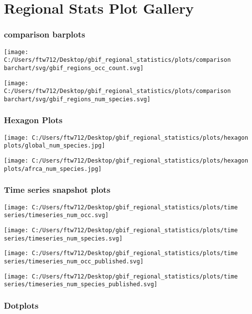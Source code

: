 \documentclass[]{article}
\title{}
\author{}
\date{}
\begin{document}
\hypertarget{regional-stats-plot-gallery}{%
\section{Regional Stats Plot
Gallery}\label{regional-stats-plot-gallery}}

\hypertarget{comparison-barplots}{%
\subsubsection{comparison barplots}\label{comparison-barplots}}

\texttt{[image: C:/Users/ftw712/Desktop/gbif\_regional\_statistics/plots/comparison barchart/svg/gbif\_regions\_occ\_count.svg]}

\texttt{[image: C:/Users/ftw712/Desktop/gbif\_regional\_statistics/plots/comparison barchart/svg/gbif\_regions\_num\_species.svg]}

\hypertarget{hexagon-plots}{%
\subsubsection{Hexagon Plots}\label{hexagon-plots}}

\texttt{[image: C:/Users/ftw712/Desktop/gbif\_regional\_statistics/plots/hexagon plots/global\_num\_species.jpg]}

\texttt{[image: C:/Users/ftw712/Desktop/gbif\_regional\_statistics/plots/hexagon plots/afrca\_num\_species.jpg]}

\hypertarget{time-series-snapshot-plots}{%
\subsubsection{Time series snapshot
plots}\label{time-series-snapshot-plots}}

\texttt{[image: C:/Users/ftw712/Desktop/gbif\_regional\_statistics/plots/time series/timeseries\_num\_occ.svg]}

\texttt{[image: C:/Users/ftw712/Desktop/gbif\_regional\_statistics/plots/time series/timeseries\_num\_species.svg]}

\texttt{[image: C:/Users/ftw712/Desktop/gbif\_regional\_statistics/plots/time series/timeseries\_num\_occ\_published.svg]}

\texttt{[image: C:/Users/ftw712/Desktop/gbif\_regional\_statistics/plots/time series/timeseries\_num\_species\_published.svg]}

\hypertarget{dotplots}{%
\subsubsection{Dotplots}\label{dotplots}}
\end{document}
